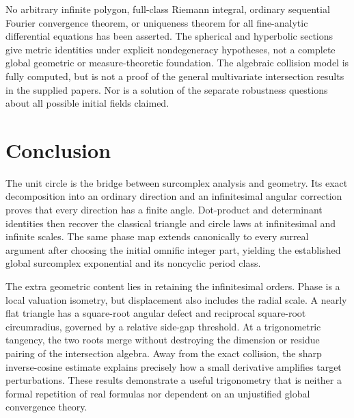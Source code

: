 \documentclass[11pt,letterpaper]{article}
\theoremstyle{definition}
\theoremstyle{remark}
\numberwithin{equation}{section}
\begin{document}
No arbitrary infinite polygon, full-class Riemann integral, ordinary sequential Fourier convergence theorem, or uniqueness theorem for all fine-analytic differential equations has been asserted. The spherical and hyperbolic sections give metric identities under explicit nondegeneracy hypotheses, not a complete global geometric or measure-theoretic foundation. The algebraic collision model is fully computed, but is not a proof of the general multivariate intersection results in the supplied papers. Nor is a solution of the separate robustness questions about all possible initial fields claimed.

\section{Conclusion}
The unit circle is the bridge between surcomplex analysis and geometry. Its exact decomposition into an ordinary direction and an infinitesimal angular correction proves that every direction has a finite angle. Dot-product and determinant identities then recover the classical triangle and circle laws at infinitesimal and infinite scales. The same phase map extends canonically to every surreal argument after choosing the initial omnific integer part, yielding the established global surcomplex exponential and its noncyclic period class.

The extra geometric content lies in retaining the infinitesimal orders. Phase is a local valuation isometry, but displacement also includes the radial scale. A nearly flat triangle has a square-root angular defect and reciprocal square-root circumradius, governed by a relative side-gap threshold. At a trigonometric tangency, the two roots merge without destroying the dimension or residue pairing of the intersection algebra. Away from the exact collision, the sharp inverse-cosine estimate explains precisely how a small derivative amplifies target perturbations. These results demonstrate a useful trigonometry that is neither a formal repetition of real formulas nor dependent on an unjustified global convergence theory.

\appendix
\end{document}
